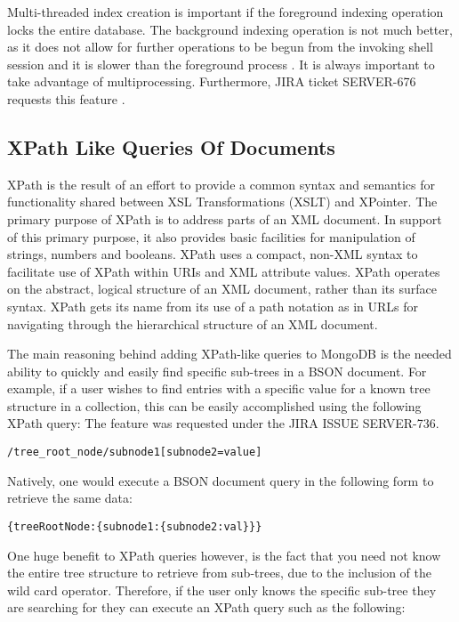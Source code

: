 \documentclass{dependencies/acm_proc_article-sp}
\begin{document}
Multi-threaded index creation is important if the foreground indexing operation locks the entire database.  The background indexing operation is not much better, as it does not allow for further operations to be begun from the invoking shell session and it is slower than the foreground process \cite{17}.  It is always important to take advantage of multiprocessing.
Furthermore, JIRA ticket SERVER-676 requests this feature \cite{8}.

\subsection{XPath Like Queries Of Documents}
XPath is the result of an effort to provide a common syntax and semantics for functionality shared between XSL Transformations (XSLT) and XPointer.
The primary purpose of XPath is to address parts of an XML document\cite{10}.
In support of this primary purpose, it also provides basic facilities for manipulation of strings, numbers and booleans.
XPath uses a compact, non-XML syntax to facilitate use of XPath within URIs and XML attribute values.
XPath operates on the abstract, logical structure of an XML document, rather than its surface syntax.
XPath gets its name from its use of a path notation as in URLs for navigating through the hierarchical structure of an XML document.

The main reasoning behind adding XPath-like queries to MongoDB is the needed ability to quickly and easily find specific sub-trees in a BSON document.
For example, if a user wishes to find entries with a specific value for a known tree structure in a collection, this can be easily accomplished using the following XPath query:
The feature was requested under the JIRA ISSUE SERVER-736\cite{15}.

\begin{lstlisting}
/tree_root_node/subnode1[subnode2=value]
\end{lstlisting}
Natively, one would execute a BSON document query in the following form to retrieve the same data:

\begin{lstlisting}
{treeRootNode:{subnode1:{subnode2:val}}}
\end{lstlisting}
One huge benefit to XPath queries however, is the fact that you need not know the entire tree structure to retrieve from sub-trees, due to the inclusion of the wild card operator.
Therefore, if the user only knows the specific sub-tree they are searching for they can execute an XPath query such as the following:
\end{document}
